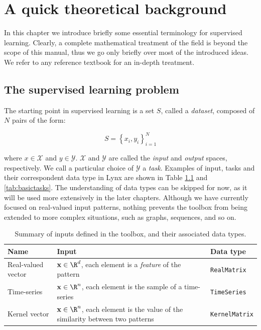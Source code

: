 \chapter{A quick theoretical background}
\label{chap:theoreticalbackground}

In this chapter we introduce briefly some essential terminology for supervised learning. Clearly, a complete mathematical treatment of the field is beyond the scope of this manual, thus we go only briefly over most of the introduced ideas. We refer to any reference textbook for an in-depth treatment.\cite{alpaydin2004introduction,Friedman2009,Mohri2012}

\section{The supervised learning problem}

The starting point in supervised learning is a set $S$, called a \textit{dataset}, composed of $N$ pairs of the form:

\begin{equation}
S = \left\{ x_i, y_i \right\}_{i=1}^N
\label{eq:dataset}
\end{equation}

\noindent where $x \in \mathcal{X}$ and $y \in \mathcal{Y}$. $\mathcal{X}$ and $\mathcal{Y}$ are called the \textit{input} and \textit{output} spaces, respectively.  We call a particular choice of $\mathcal{Y}$ a \textit{task}. Examples of input, tasks and their correspondent data type in Lynx are shown in Table \ref{tab:basicinputs} and \ref{tab:basictasks}. The understanding of data types can be skipped for now, as it will be used more extensively in the later chapters. Although we have currently focused on real-valued input patterns, nothing prevents the toolbox from being extended to more complex situations, such as graphs, sequences, and so on.

\vspace{-2em}

\begin{center}
\begin{table}[t]
{\centering\hfill{}
\begin{tabular}{p{}p{}p{}}
\toprule
Name & Input & Data type \\ 
\midrule
Real-valued vector & $\vect{x} \in \R^{d}$, each element is a \textit{feature} of the pattern & \verb|RealMatrix|  \\
Time-series & $\vect{x} \in \R^n$, each element is the sample of a time-series & \verb|TimeSeries| \\
Kernel vector &  $\vect{x} \in \R^n$, each element is the value of the similarity between two patterns & \verb|KernelMatrix| \\
\bottomrule
\end{tabular}}
\hfill{}
\caption{Summary of inputs defined in the toolbox, and their associated data types.}
\label{tab:basicinputs}
\end{table}
\end{center}

